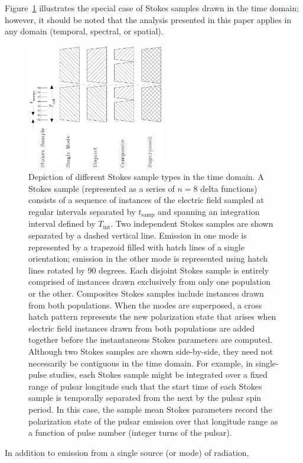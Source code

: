 \documentclass[twocolumn]{aastex6}
\newcommand{\Fig}[1]{Figure~\ref{fig:#1}}
\begin{document}
\Fig{regimes} illustrates the special case of Stokes samples drawn in
the time domain; however, it should be noted that the analysis
presented in this paper applies in any domain (temporal, spectral, or
spatial).
%
\begin{figure}
\centerline{\includegraphics[angle=-90,width=60mm]{regimes.eps}}
\caption{\label{fig:regimes} Depiction of different Stokes sample
  types in the time domain.  A Stokes sample (represented as a series
  of $n=8$ delta functions) consists of a sequence of instances of the
  electric field sampled at regular intervals separated by
  $t_\mathrm{samp}$ and spanning an integration interval defined by
  $T_\mathrm{int}$.  Two independent Stokes samples are shown
  separated by a dashed vertical line.  Emission in one mode is
  represented by a trapezoid filled with hatch lines of a single
  orientation; emission in the other mode is represented using hatch
  lines rotated by 90 degrees.  Each disjoint Stokes sample is
  entirely comprised of instances drawn exclusively from only one
  population or the other.  Composites Stokes samples include
  instances drawn from both populations.  When the modes are
  superposed, a cross hatch pattern represents the new polarization
  state that arises when electric field instances drawn from both
  populations are added together before the instantaneous Stokes
  parameters are computed.
%
  Although two Stokes samples are shown side-by-side, they need not
  necessarily be contiguous in the time domain.
%
  For example, in single-pulse studies, each Stokes sample might be
  integrated over a fixed range of pulsar longitude such that the
  start time of each Stokes sample is temporally separated from the
  next by the pulsar spin period.
%
  In this case, the sample mean Stokes parameters record the
  polarization state of the pulsar emission over that longitude range
  as a function of pulse number (integer turns of the pulsar).
%
}
\end{figure}
%
In addition to emission from a single source (or mode) of radiation,
\end{document}
